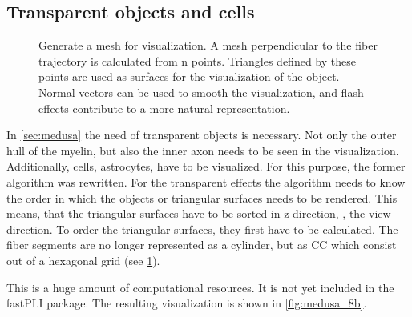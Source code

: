 \subsection{Transparent objects and cells}
%
\begin{figure}[!t]
    \centering
    \setlength{\tikzwidth}{0.75\textwidth}
	\caption{Generate a mesh for visualization. A mesh perpendicular to the fiber trajectory is calculated from n points. Triangles defined by these points are used as surfaces for the visualization of the object. Normal vectors can be used to smooth the visualization, and flash effects contribute to a more natural representation.}
	\label{fig:vis_mesh}
\end{figure}
%
In \cref{sec:medusa} the need of transparent objects is necessary.
Not only the outer hull of the myelin, but also the inner axon needs to be seen in the visualization.
Additionally, cells, \eg{} astrocytes, have to be visualized.
For this purpose, the former algorithm was rewritten.
For the transparent effects the algorithm needs to know the order in which the objects or triangular surfaces needs to be rendered.
This means, that the triangular surfaces have to be sorted in z-direction, \ie{}, the view direction.
To order the triangular surfaces, they first have to be calculated.
The fiber segments are no longer represented as a cylinder, but as \ac{CC} which consist out of a hexagonal grid (see \cref{fig:vis_mesh}).
\par
% 
This is a huge amount of computational resources.
It is not yet included in the \ac{fastPLI} package.
The resulting visualization is shown in \cref{fig:medusa_8b}.
% 
% 
% 
